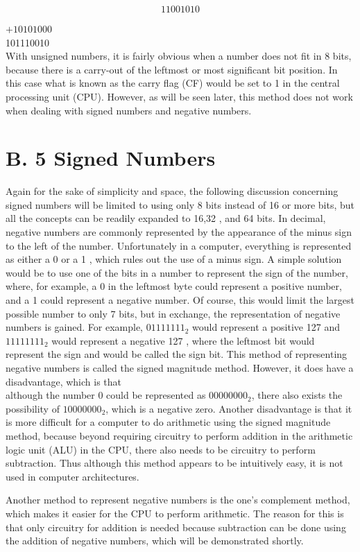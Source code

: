 \documentclass[10pt]{book}
\begin{document}
$$
11001010
$$

$+10101000$\\
101110010\\
With unsigned numbers, it is fairly obvious when a number does not fit in 8 bits, because there is a carry-out of the leftmost or most significant bit position. In this case what is known as the carry flag (CF) would be set to 1 in the central processing unit (CPU). However, as will be seen later, this method does not work when dealing with signed numbers and negative numbers.

\section*{B. 5 Signed Numbers}
Again for the sake of simplicity and space, the following discussion concerning signed numbers will be limited to using only 8 bits instead of 16 or more bits, but all the concepts can be readily expanded to 16,32 , and 64 bits. In decimal, negative numbers are commonly represented by the appearance of the minus sign to the left of the number. Unfortunately in a computer, everything is represented as either a 0 or a 1 , which rules out the use of a minus sign. A simple solution would be to use one of the bits in a number to represent the sign of the number, where, for example, a 0 in the leftmost byte could represent a positive number, and a 1 could represent a negative number. Of course, this would limit the largest possible number to only 7 bits, but in exchange, the representation of negative numbers is gained. For example, $01111111_{2}$ would represent a positive 127 and $11111111_{2}$ would represent a negative 127 , where the leftmost bit would represent the sign and would be called the sign bit. This method of representing negative numbers is called the signed magnitude method. However, it does have a disadvantage, which is that\\
although the number 0 could be represented as $00000000_{2}$, there also exists the possibility of $10000000_{2}$, which is a negative zero. Another disadvantage is that it is more difficult for a computer to do arithmetic using the signed magnitude method, because beyond requiring circuitry to perform addition in the arithmetic logic unit (ALU) in the CPU, there also needs to be circuitry to perform subtraction. Thus although this method appears to be intuitively easy, it is not used in computer architectures.

Another method to represent negative numbers is the one's complement method, which makes it easier for the CPU to perform arithmetic. The reason for this is that only circuitry for addition is needed because subtraction can be done using the addition of negative numbers, which will be demonstrated shortly.
\end{document}
